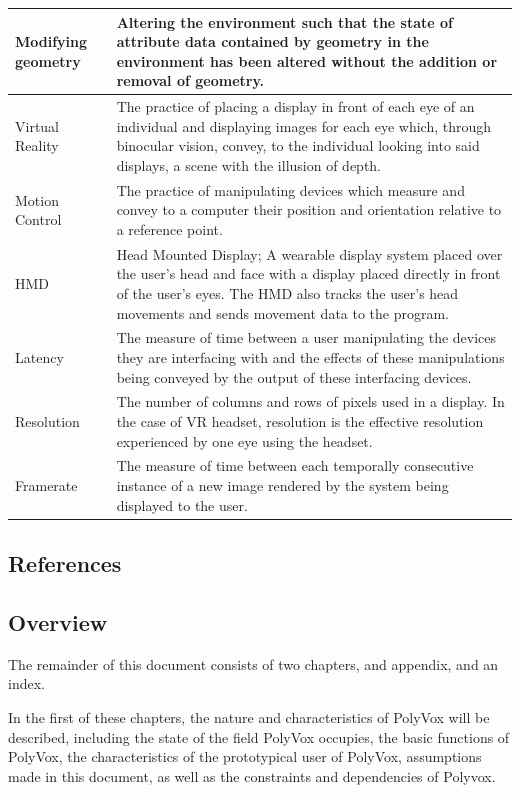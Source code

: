\documentclass[onecolumn, draftclsnofoot,10pt, compsoc]{IEEEtran}
\begin{document}
\begin{longtable}{ | l | p{12cm} | }
 Modifying geometry & Altering the environment such that the state of attribute data contained by geometry in the environment has been altered without the addition or removal of geometry.  \\ \hline
 Virtual Reality & The practice of placing a display in front of each eye of an individual and displaying images for each eye which, through binocular vision, convey, to the individual looking into said displays, a scene with the illusion of depth.  \\ \hline
 Motion Control & The practice of manipulating devices which measure and convey to a computer their position and orientation relative to a reference point.  \\ \hline
 HMD & Head Mounted Display; A wearable display system placed over the user’s head and face with a display placed directly in front of the user’s eyes. The HMD also tracks the user’s head movements and sends movement data to the program.  \\ \hline
 Latency & The measure of time between a user manipulating the devices they are interfacing with and the effects of these manipulations being conveyed by the output of these interfacing devices. \\ \hline
 Resolution & The number of columns and rows of pixels used in a display. In the case of  VR headset, resolution is the effective resolution experienced by one eye using the headset. \\ \hline
 Framerate & The measure of time between each temporally consecutive instance of a new image rendered by the system being displayed to the user. \\ \hline
 \hline 
\end{longtable}
\subsection{References}

{}
\subsection{Overview}
The remainder of this document consists of two chapters, and appendix, and an index.

In the first of these chapters, the nature and characteristics of PolyVox will be described, including the state of the field PolyVox occupies, the basic functions of PolyVox, the characteristics of the prototypical user of PolyVox, assumptions made in this document, as well as the constraints and dependencies of Polyvox.
\end{document}

